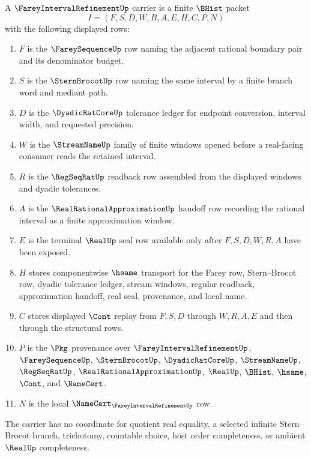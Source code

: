 \begin{definition}
\label{def:farey-interval-refinement-carrier}
A $\FareyIntervalRefinementUp$ carrier is a finite $\BHist$ packet
$$
I=(F,S,D,W,R,A,E,H,C,P,N)
$$
with the following displayed rows:
\begin{enumerate}
\item $F$ is the $\FareySequenceUp$ row naming the adjacent rational boundary pair and its denominator budget.
\item $S$ is the $\SternBrocotUp$ row naming the same interval by a finite branch word and mediant path.
\item $D$ is the $\DyadicRatCoreUp$ tolerance ledger for endpoint conversion, interval width, and requested precision.
\item $W$ is the $\StreamNameUp$ family of finite windows opened before a real-facing consumer reads the retained interval.
\item $R$ is the $\RegSeqRatUp$ readback row assembled from the displayed windows and dyadic tolerances.
\item $A$ is the $\RealRationalApproximationUp$ handoff row recording the rational interval as a finite approximation window.
\item $E$ is the terminal $\RealUp$ seal row available only after $F,S,D,W,R,A$ have been exposed.
\item $H$ stores componentwise $\hsame$ transport for the Farey row, Stern--Brocot row, dyadic tolerance ledger, stream windows, regular readback, approximation handoff, real seal, provenance, and local name.
\item $C$ stores displayed $\Cont$ replay from $F,S,D$ through $W,R,A,E$ and then through the structural rows.
\item $P$ is the $\Pkg$ provenance over $\FareyIntervalRefinementUp$, $\FareySequenceUp$, $\SternBrocotUp$, $\DyadicRatCoreUp$, $\StreamNameUp$, $\RegSeqRatUp$, $\RealRationalApproximationUp$, $\RealUp$, $\BHist$, $\hsame$, $\Cont$, and $\NameCert$.
\item $N$ is the local $\NameCert_{\FareyIntervalRefinementUp}$ row.
\end{enumerate}
The carrier has no coordinate for quotient real equality, a selected infinite Stern--Brocot branch, trichotomy, countable choice, host order completeness, or ambient $\RealUp$ completeness.
\end{definition}

